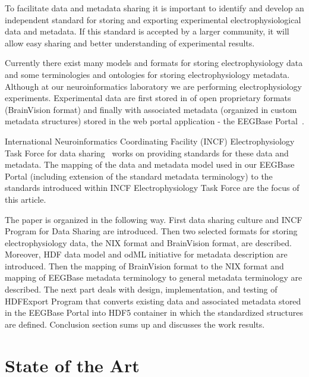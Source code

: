 \documentclass[conference]{IEEEtran}
\begin{document}
To facilitate data and metadata sharing it is important to identify and develop an independent standard for storing and exporting experimental electrophysiological data and metadata. If this standard is accepted by a larger community, it will allow easy sharing and better understanding of experimental results.

Currently there exist many models and formats for storing electrophysiology data and some terminologies and ontologies for storing electrophysiology metadata. Although at our neuroinformatics laboratory we are performing electrophysiology experiments. Experimental data are first stored in of open proprietary formats (BrainVision format) and finally with associated metadata (organized in custom metadata structures) stored in the web portal application - the EEGBase Portal~\cite{eegportal}. 

International Neuroinformatics Coordinating Facility (INCF) Electrophysiology Task Force for data sharing~\cite{incfwebtaskforce} works on providing standards for these data and metadata. The mapping of the data and metadata model used in our EEGBase Portal (including extension of the standard metadata terminology) to the standards introduced within INCF Electrophysiology Task Force are the focus of this article.   

The paper is organized in the following way. First data sharing culture and INCF Program for Data Sharing are introduced. Then two selected formats for storing electrophysiology data, the NIX format and BrainVision format, are described. Moreover, HDF data model and odML initiative for metadata description are introduced. Then the mapping of BrainVision format to the NIX format and mapping of EEGBase metadata terminology to general metadata terminology are described. The next part deals with design, implementation, and testing of HDFExport Program that converts existing data and associated metadata stored in the EEGBase Portal into HDF5 container in which the standardized structures are defined. Conclusion section sums up and discusses the work results.

\section{State of the Art}
\end{document}

